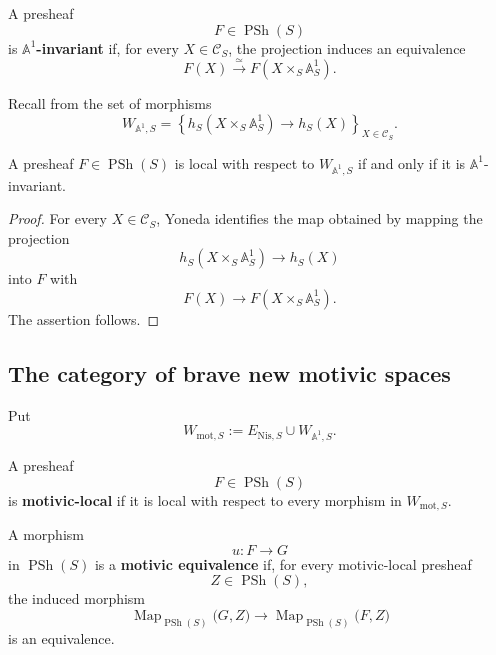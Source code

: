 \begin{definition}
\label{def:brave-new-affine-line-invariance}
A presheaf
\[
    F
    \in
    \operatorname{PSh}(S)
\]
is \textbf{\(\mathbb A^1\)-invariant} if, for every
\(X\in\mathcal C_S\), the projection induces an equivalence
\[
    F(X)
    \xrightarrow{\simeq}
    F(X\times_S\mathbb A^1_S).
\]
\end{definition}

Recall from
the set of morphisms
\[
    W_{\mathbb A^1,S}
    =
    \left\{
        h_S(X\times_S\mathbb A^1_S)
        \longrightarrow
        h_S(X)
    \right\}_{X\in\mathcal C_S}.
\]

\begin{proposition}
\label{prop:affine-line-local-objects}
A presheaf \(F\in\operatorname{PSh}(S)\) is local with respect to
\(W_{\mathbb A^1,S}\) if and only if it is
\(\mathbb A^1\)-invariant.
\end{proposition}

\begin{proof}
For every \(X\in\mathcal C_S\), Yoneda identifies the map obtained by
mapping the projection
\[
    h_S(X\times_S\mathbb A^1_S)
    \longrightarrow
    h_S(X)
\]
into \(F\) with
\[
    F(X)
    \longrightarrow
    F(X\times_S\mathbb A^1_S).
\]
The assertion follows.
\end{proof}

\subsection{The category of brave new motivic spaces}

\begin{definition}
\label{def:brave-new-motivic-localization-data}
Put
\[
    W_{\mathrm{mot},S}
    :=
    E_{\mathrm{Nis},S}
    \cup
    W_{\mathbb A^1,S}.
\]

A presheaf
\[
    F
    \in
    \operatorname{PSh}(S)
\]
is \textbf{motivic-local} if it is local with respect to every
morphism in \(W_{\mathrm{mot},S}\).

A morphism
\[
    u
    \colon
    F
    \longrightarrow
    G
\]
in \(\operatorname{PSh}(S)\) is a
\textbf{motivic equivalence} if, for every motivic-local presheaf
\[
    Z
    \in
    \operatorname{PSh}(S),
\]
the induced morphism
\[
    \operatorname{Map}_{\operatorname{PSh}(S)}
    \bigl(
        G,
        Z
    \bigr)
    \longrightarrow
    \operatorname{Map}_{\operatorname{PSh}(S)}
    \bigl(
        F,
        Z
    \bigr)
\]
is an equivalence.
\end{definition}

